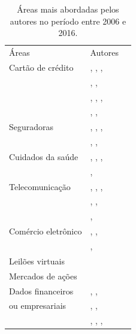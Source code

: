 \documentclass[smallextended]{svjour3}
\begin{document}
\begin{table}
	\caption{Áreas mais abordadas pelos autores no período entre 2006 e 2016.}
	\label{tab:areasabordadas}       %
	\begin{tabular}[!Ht]{lll}
		\hline\noalign{\smallskip}
		Áreas & Autores  \\
		\noalign{\smallskip}\hline\noalign{\smallskip}
		Cartão de crédito & \cite{Abdallah2016}, \cite{Bansal2016}, \cite{Ahmed2015},  &  \\
		 & \cite{Edge2009}, \cite{Allan2010},  &  \\
		 & \cite{Pejic-Bach2010}, \cite{Raj2011}, \cite{Perlich2007},  &  \\
		 & \cite{Kanapickiene2015}, \cite{Branco2016}, \cite{Akoglu2015}  &  \\
		 
		Seguradoras & \cite{Abdallah2016}, \cite{Bansal2016}, \cite{Ahmed2015}, &  \\
		& \cite{Pejic-Bach2010}, \cite{Branco2016}, \cite{Akoglu2015}  &  \\
		
		Cuidados da saúde & \cite{Abdallah2016}, \cite{Bauder2016}, \cite{Li2008},  &  \\
		& \cite{Bansal2016}, \cite{Pejic-Bach2010} &  \\
		
		Telecomunicação & \cite{Abdallah2016}, \cite{Ahmed2015}, \cite{Allan2010},  &  \\
		& \cite{Pejic-Bach2010}, \cite{Pejic-Bach2010}, &  \\
		& \cite{Branco2016}, \cite{Akoglu2015}  &  \\
		
		Comércio eletrônico & \cite{Abdallah2016}, \cite{Pejic-Bach2010},  &  \\
		& \cite{Branco2016}, \cite{Akoglu2015}  &  \\
		
		Leilões virtuais & \cite{Abdallah2016} &  \\
		
		Mercados de ações & \cite{Ahmed2015} &  \\
		
		Dados financeiros & \cite{Flegel2010}, \cite{Edge2009},  &  \\
		ou empresariais & \cite{Gullkvist2013}, \cite{Allan2010},   &  \\
		& \cite{Pejic-Bach2010}, \cite{Wang2010}, \cite{Branco2016}, \cite{Akoglu2015}  &  \\
		

\end{tabular}
\end{table}
\end{document}
